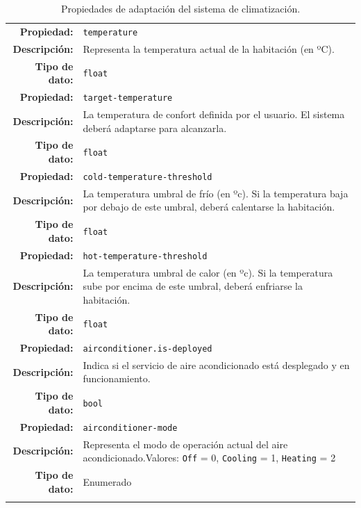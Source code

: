 \begin{longtable}{|r p{11.5cm}|}
    \hline
    \textbf{Propiedad:} & \texttt{temperature}  \\
    \textbf{Descripción:} & Representa la temperatura actual de la habitación (en ºC).  \\
    \textbf{Tipo de dato:} & \texttt{float} \\
    \hline
    \textbf{Propiedad:} & \texttt{target-temperature}  \\
    \textbf{Descripción:} & La temperatura de confort definida por el usuario. El sistema deberá adaptarse para alcanzarla.  \\
    \textbf{Tipo de dato:} & \texttt{float} \\
    \hline
    \textbf{Propiedad:} & \texttt{cold-temperature-threshold}  \\
    \textbf{Descripción:} & La temperatura umbral de frío (en ºc). Si la temperatura baja por debajo de este umbral, deberá calentarse la habitación. \\
    \textbf{Tipo de dato:} & \texttt{float} \\
    \hline
    \textbf{Propiedad:} & \texttt{hot-temperature-threshold}  \\
    \textbf{Descripción:} & La temperatura umbral de calor (en ºc). Si la temperatura sube por encima de este umbral, deberá enfriarse la habitación. \\
    \textbf{Tipo de dato:} & \texttt{float} \\
    \hline
    \textbf{Propiedad:} & \texttt{airconditioner.is-deployed}  \\
    \textbf{Descripción:} & Indica si el servicio de aire acondicionado está desplegado y en funcionamiento.  \\
    \textbf{Tipo de dato:} & \texttt{bool} \\
    \hline
    \textbf{Propiedad:} & \texttt{airconditioner-mode}  \\
    \textbf{Descripción:} & Representa el modo de operación actual del aire acondicionado.\linebreak Valores: \texttt{Off} = 0, \texttt{Cooling} = 1, \texttt{Heating} = 2  \\
    \textbf{Tipo de dato:} & Enumerado \\
    \hline

  \caption{Propiedades de adaptación del sistema de climatización.}
  \label{tab:climatisation-adaption-properties}
\end{longtable}

